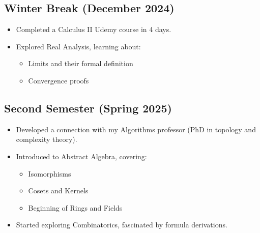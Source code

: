 \documentclass{article}
\begin{document}
\subsection{Winter Break (December 2024)}
\begin{itemize}
    \item Completed a Calculus II Udemy course in 4 days.
    \item Explored Real Analysis, learning about:
    \begin{itemize}
        \item Limits and their formal definition
        \item Convergence proofs
    \end{itemize}
\end{itemize}

\break
\subsection{Second Semester (Spring 2025)}
\begin{itemize}
    \item Developed a connection with my Algorithms professor (PhD in topology and complexity theory).
    \item Introduced to Abstract Algebra, covering:
    \begin{itemize}
        \item Isomorphisms
        \item Cosets and Kernels
        \item Beginning of Rings and Fields
    \end{itemize}
    \item Started exploring Combinatorics, fascinated by formula derivations.
\end{itemize}
\end{document}
